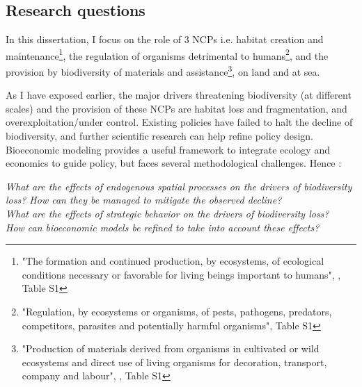 {}
\subsection*{Research questions}


In this dissertation, I focus on the role of 3 NCPs i.e. habitat creation and maintenance\footnote{"The formation and continued production, by ecosystems, of ecological conditions necessary or favorable for living beings important to humans", \citep{diaz_2018}, Table S1}, the regulation of organisms detrimental to humans\footnote{"Regulation, by ecosystems or organisms, of pests, pathogens, predators, competitors, parasites and potentially harmful organisms"\citep{diaz_2018}, Table S1}, and the provision by biodiversity of materials and assistance\footnote{"Production of materials derived from organisms in cultivated or wild ecosystems and direct use of living organisms for decoration, transport, company and labour", \citep{diaz_2018}, Table S1}, on land and at sea. 

As I have exposed earlier, the major drivers threatening biodiversity (at different scales) and the provision of these NCPs are habitat loss and fragmentation, and overexploitation/under control. Existing policies have failed to halt the decline of biodiversity, and further scientific research can help refine policy design. Bioeconomic modeling provides a useful framework to integrate ecology and economics to guide policy, but faces several methodological challenges. Hence : 

\begin{displayquote}
\textit{What are the effects of endogenous spatial processes on the drivers of biodiversity loss? How can they be managed to mitigate the observed decline?}
\\
\textit{What are the effects of strategic behavior on the drivers of biodiversity loss? }
\\
\textit{How can bioeconomic models be refined to take into account these effects?}
\end{displayquote}
 
